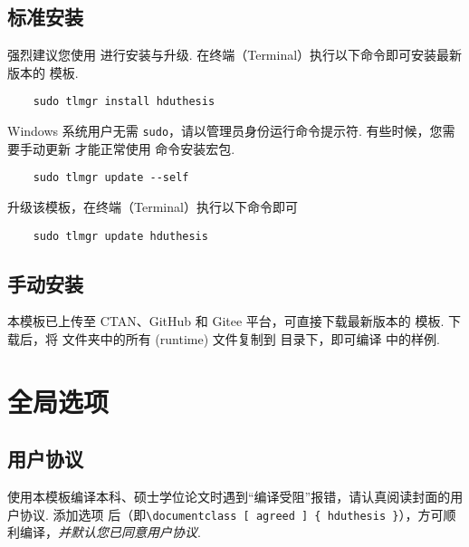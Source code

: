 \subsection{标准安装}

强烈建议您使用  进行安装与升级. 在终端（Terminal）执行以下命令即可安装最新版本的  模板.

\begin{framed}
  \begin{verbatim}
    sudo tlmgr install hduthesis
  \end{verbatim}
\end{framed}

Windows 系统用户无需 \verb|sudo|，请以管理员身份运行命令提示符. 有些时候，您需要手动更新  才能正常使用  命令安装宏包.

\begin{framed}
  \begin{verbatim}
    sudo tlmgr update --self
  \end{verbatim}
\end{framed}

升级该模板，在终端（Terminal）执行以下命令即可

\begin{framed}
  \begin{verbatim}
    sudo tlmgr update hduthesis
  \end{verbatim}
\end{framed}

\subsection{手动安装}

本模板已上传至 CTAN、GitHub 和 Gitee 平台，可直接下载最新版本的  模板. 下载后，将  文件夹中的所有 (runtime) 文件复制到  目录下，即可编译  中的样例.

\section{全局选项}

\subsection{用户协议}

使用本模板编译本科、硕士学位论文时遇到``编译受阻''报错，请认真阅读封面的用户协议.
添加选项  后（即\verb|\documentclass [ agreed ] { hduthesis }|），方可顺利编译，\emph{并默认您已同意用户协议}.

